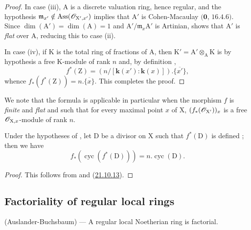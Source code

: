 \begin{proof}
In case (iii), $\mathrm{A}$ is a discrete valuation ring, hence regular, and the hypothesis $\mathfrak{m}_{x'}\notin\operatorname{Ass}(\mathscr{O}_{\mathrm{X}',x'})$ implies that $\mathrm{A}'$ is Cohen-Macaulay $(\mathbf{0}$, $16.4.6)$.  Since $\dim(\mathrm{A}')=\dim(\mathrm{A})=1$ and $\mathrm{A}'/\mathfrak{m}_x\mathrm{A}'$ is Artinian,  shows that $\mathrm{A}'$ is \emph{flat} over $\mathrm{A}$, reducing this to case (ii).

In case (iv), if $\mathrm{K}$ is the total ring of fractions of $\mathrm{A}$, then $\mathrm{K}'=\mathrm{A}'\otimes_{\mathrm{A}}\mathrm{K}$ is by hypothesis a free $\mathrm{K}$-module of rank $n$ and, by definition ,
\[
  f^*(\mathrm{Z})=(n/[\boldsymbol{k}(x'):\boldsymbol{k}(x)]).\overline{\{x'\}},
\]
whence $f_*(f^*(\mathrm{Z}))=n.\overline{\{x\}}$. This completes the proof.
\end{proof}

We note that the formula  is applicable in particular when the morphism $f$ is \emph{finite} and \emph{flat} and such that for every maximal point $x$ of $\mathrm{X}$, $(f_*(\mathscr{O}_{\mathrm{X}'}))_x$ is a free $\mathscr{O}_{\mathrm{X},x}$-module of rank $n$.

\begin{corollary}[21.10.19]
\label{IV.21.10.19}
Under the hypotheses of , let $\mathrm{D}$ be a divisor on $\mathrm{X}$ such that $f^*(\mathrm{D})$ is defined ; then we have
\[
\label{IV.21.10.19.1}
  f_*(\operatorname{cyc}(f^*(\mathrm{D})))=n.\operatorname{cyc}(\mathrm{D}).
  \tag{21.10.19.1}
\]
\end{corollary}

\begin{proof}
This follows from  and (\hyperref[IV.21.10.13bis]{21.10.13}).
\end{proof}
\subsection{Factoriality of regular local rings}
\label{subsection:IV.21.11}
\label{IV.21.11}

\begin{theorem}[21.11.1]
\label{IV.21.11.1}
\textup{(Auslander-Buchsbaum)} ---
A regular local Noetherian ring is factorial.
\end{theorem}

